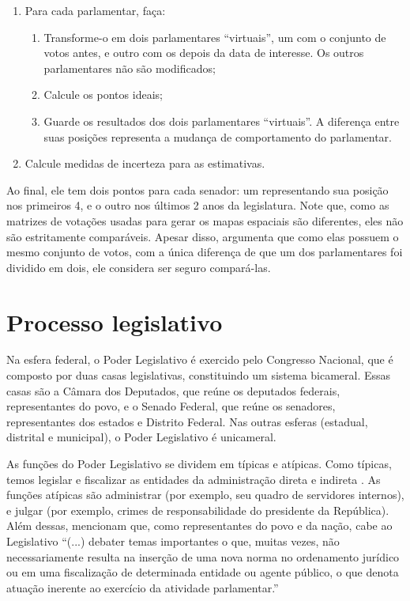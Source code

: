 \documentclass[a4paper,titlepage]{ppgi}\usepackage[]{graphicx}\usepackage[]{color}
\begin{document}
\begin{enumerate}
  \item Para cada parlamentar, faça:
    \begin{enumerate}
      \item Transforme-o em dois parlamentares ``virtuais'', um com o conjunto
de votos antes, e outro com os depois da data de interesse. Os outros
parlamentares não são modificados;
      \item Calcule os pontos ideais;
      \item Guarde os resultados dos dois parlamentares ``virtuais''. A
diferença entre suas posições representa a mudança de comportamento do
parlamentar.
    \end{enumerate}
  \item Calcule medidas de incerteza para as estimativas.
\end{enumerate}

Ao final, ele tem dois pontos para cada senador: um representando sua posição
nos primeiros 4, e o outro nos últimos 2 anos da legislatura. Note que, como as
matrizes de votações usadas para gerar os mapas espaciais são diferentes, eles
não são estritamente comparáveis. Apesar disso, 
argumenta que como elas possuem o mesmo conjunto de votos, com a única
diferença de que um dos parlamentares foi dividido em dois, ele considera ser
seguro compará-las.

\section{Processo legislativo}
\label{cap:fundamentacao:processo-legislativo}

Na esfera federal, o Poder Legislativo é exercido pelo Congresso Nacional, que
é composto por duas casas legislativas, constituindo um sistema bicameral. Essas
casas são a Câmara dos Deputados, que reúne os deputados federais,
representantes do povo, e o Senado Federal, que reúne os senadores,
representantes dos estados e Distrito Federal. Nas outras esferas (estadual,
distrital e municipal), o Poder Legislativo é unicameral.

As funções do Poder Legislativo se dividem em típicas e atípicas. Como típicas,
temos legislar \cite[arts. 48, 49, 51 e 52]{CF1988} e fiscalizar as entidades da
administração direta e indireta \cite[art. 70]{CF1988}. As funções atípicas são
administrar (por exemplo, seu quadro de servidores internos), e julgar (por
exemplo, crimes de responsabilidade do presidente da República). Além dessas,
 mencionam que, como representantes do povo e da
nação, cabe ao Legislativo ``(...) debater temas importantes o que, muitas
vezes, não necessariamente resulta na inserção de uma nova norma no ordenamento
jurídico ou em uma fiscalização de determinada entidade ou agente público, o
que denota atuação inerente ao exercício da atividade parlamentar.''
\end{document}
